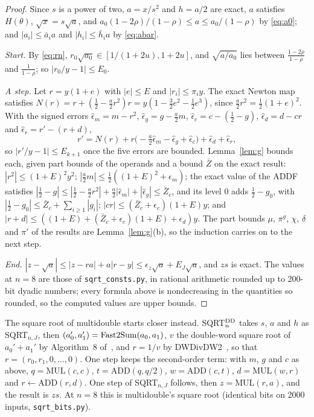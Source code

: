 \begin{proof}
Since $s$ is a power of two, $a = x/s^2$ and $h = a/2$ are exact, $a$ satisfies $H(\theta)$, $\sqrt x = s\sqrt a$, and
$a_0(1-2\rho)/(1-\rho) \le a \le a_0/(1-\rho)$ by \eqref{eq:a0}; and $|a_i| \le \bar a_ia$ and $|h_i| \le \bar h_ia$ by \eqref{eq:abar}.

\emph{Start.} By \eqref{eq:rn}, $r_0\sqrt{a_0} \in [1/(1+2u), 1+2u]$, and $\sqrt{a/a_0}$ lies between $\frac{1-2\rho}
{1-\rho}$ and $\frac1{1-\rho}$; so $|r_0/y - 1| \le E_0$.

\emph{A step.} Let $r = y(1+e)$ with $|e| \le E$ and $|r_i| \le \pi_i y$. The exact Newton map satisfies $N(r) = r +
(\frac12 - \frac a2 r^2)r = y(1 - \frac32e^2 - \frac12e^3)$, since $\frac a2r^2 = \frac12(1+e)^2$. With the signed
errors $\hat\epsilon_m = m - r^2$, $\hat\epsilon_g = g - \frac a2 m$, $\hat\epsilon_c = c - (\frac12 - g)$,
$\hat\epsilon_d = d - cr$ and $\hat\epsilon_r = r' - (r + d)$,
\[
r' = N(r) + r\bigl(-\tfrac a2\hat\epsilon_m - \hat\epsilon_g + \hat\epsilon_c\bigr) + \hat\epsilon_d + \hat\epsilon_r,
\]
so $|r'/y - 1| \le E_{k+1}$ once the five errors are bounded. Lemma~\ref{lem:g} bounds each, given part bounds of the
operands and a bound $\bar Z$ on the exact result: $|r^2| \le (1+E)^2y^2$; $|\frac a2 m| \le \frac12((1+E)^2 +
\epsilon_m)$; the exact value of the ADDF satisfies $|\frac12 - g| \le |\frac12 - \frac a2r^2| + \frac a2|\hat\epsilon_m|
+ |\hat\epsilon_g| \le \bar Z_c$, and its level 0 adds $\frac12 - g_0$, with $|\frac12 - g_0| \le \bar Z_c + \sum_{i \ge 1}
|g_i|$; $|cr| \le (\bar Z_c + \epsilon_c)(1+E)y$; and $|r + d| \le ((1+E) + (\bar Z_c + \epsilon_c)(1+E) + \epsilon_d)y$. The
part bounds $\mu$, $\pi^g$, $\chi$, $\delta$ and $\pi'$ of the results are Lemma~\ref{lem:g}(b), so the induction
carries on to the next step.

\emph{End.} $|z - \sqrt a| \le |z - ra| + a|r - y| \le \epsilon_z\sqrt a + E_J\sqrt a$, and $zs$ is exact. The values at
$n = 8$ are those of \texttt{sqrt\_consts.py}, in rational arithmetic rounded up to 200-bit dyadic numbers; every
formula above is nondecreasing in the quantities so rounded, so the computed values are upper bounds.
\end{proof}

The square root of multidouble starts closer instead. SQRT$^{\rm DD}_n$ takes $s$, $a$ and $h$ as SQRT$_{n,J}$, then
$(a_0', a_1') = \mathrm{Fast2Sum}(a_0, a_1)$, $v$ the double-word square root of $a_0' + a_1'$ by Algorithm~8
of~\cite{LLMPR23}, and $r = 1/v$ by DWDivDW2~\cite{JMP17}, so that $r = (r_0, r_1, 0, \dots, 0)$. One step keeps the
second-order term: with $m$, $g$ and $c$ as above, $q = \mathrm{MUL}(c, c)$, $t = \mathrm{ADD}(q, q/2)$, $w =
\mathrm{ADD}(c, t)$, $d = \mathrm{MUL}(w, r)$ and $r \gets \mathrm{ADD}(r, d)$. One step of SQRT$_{n,J}$ follows,
then $z = \mathrm{MUL}(r, a)$, and the result is $zs$. At $n = 8$ this is multidouble's square root (identical bits on
2000 inputs, \texttt{sqrt\_bits.py}).


